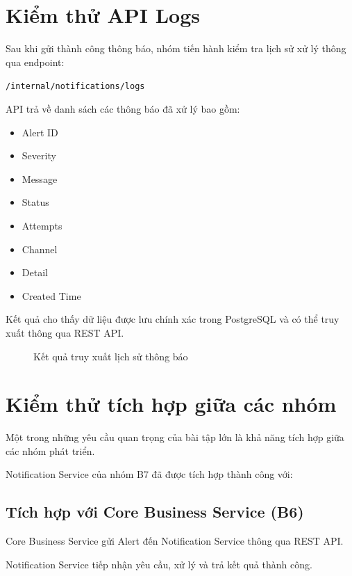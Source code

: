\section{Kiểm thử API Logs}

Sau khi gửi thành công thông báo, nhóm tiến hành kiểm tra lịch sử xử lý thông qua endpoint:

\begin{center}
\texttt{/internal/notifications/logs}
\end{center}

API trả về danh sách các thông báo đã xử lý bao gồm:

\begin{itemize}
\item Alert ID
\item Severity
\item Message
\item Status
\item Attempts
\item Channel
\item Detail
\item Created Time
\end{itemize}

Kết quả cho thấy dữ liệu được lưu chính xác trong PostgreSQL và có thể truy xuất thông qua REST API.

\begin{figure}[H]
\centering
{}
\caption{Kết quả truy xuất lịch sử thông báo}
\label{fig:logs}
\end{figure}

\section{Kiểm thử tích hợp giữa các nhóm}

Một trong những yêu cầu quan trọng của bài tập lớn là khả năng tích hợp giữa các nhóm phát triển.

Notification Service của nhóm B7 đã được tích hợp thành công với:

\subsection{Tích hợp với Core Business Service (B6)}

Core Business Service gửi Alert đến Notification Service thông qua REST API.

Notification Service tiếp nhận yêu cầu, xử lý và trả kết quả thành công.

